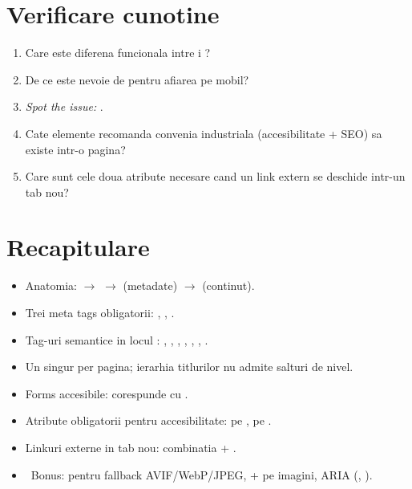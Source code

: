 \section*{Verificare cunotine}

\begin{selfcheck}
\begin{enumerate}[itemsep=2pt]
  \item Care este diferena funcionala intre  i ?
  \item De ce este nevoie de  pentru afiarea pe mobil?
  \item \emph{Spot the issue:} .
  \item Cate elemente  recomanda convenia industriala (accesibilitate + SEO) sa existe intr-o pagina?
  \item Care sunt cele doua atribute necesare cand un link extern se deschide intr-un tab nou?
\end{enumerate}
\end{selfcheck}

\section*{Recapitulare}

\begin{recap}
\begin{itemize}[itemsep=1pt]
  \item Anatomia:  $\rightarrow$  $\rightarrow$  (metadate) $\rightarrow$  (continut).
  \item Trei meta tags obligatorii: , , .
  \item Tag-uri semantice in locul : , , , , , , .
  \item Un singur  per pagina; ierarhia titlurilor nu admite salturi de nivel.
  \item Forms accesibile:  corespunde cu .
  \item Atribute obligatorii pentru accesibilitate:  pe ,  pe .
  \item Linkuri externe in tab nou: combinatia  + .
  \item \faRocket\ Bonus:  pentru fallback AVIF/WebP/JPEG,  +  pe imagini, ARIA (, ).
\end{itemize}
\end{recap}

